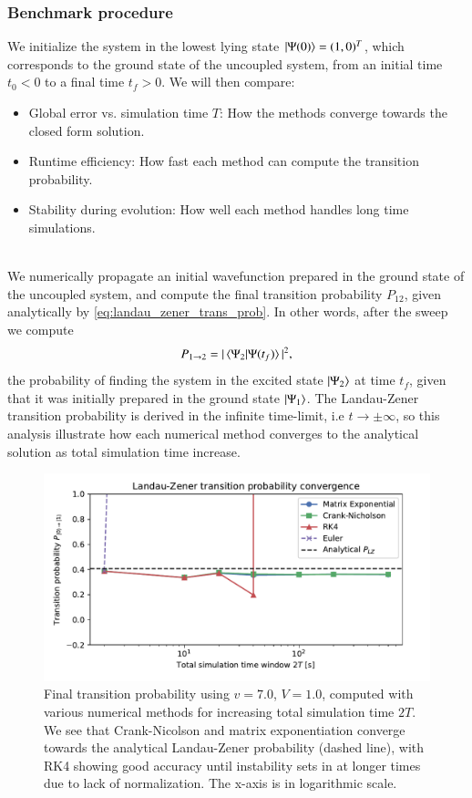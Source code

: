 \documentclass{subfiles}
\begin{document}
\subsubsection*{Benchmark procedure}
We initialize the system in the lowest lying state $\ket{\Psi(0)} = (1, 0)^T$, which corresponds to the ground state of the uncoupled system, from an initial time $t_0<0$ to a final time $t_f>0$. We will then compare:
\begin{itemize}
    \item Global error vs. simulation time $T$: How the methods converge towards the closed form solution.
    \item Runtime efficiency: How fast each method can compute the transition probability.
    \item Stability during evolution: How well each method handles long time simulations. 
\end{itemize}
\\ 
We numerically propagate an initial wavefunction prepared in the ground state of the uncoupled system, and compute the final transition probability $P_{12}$, given analytically by \eqref{eq:landau_zener_trans_prob}. In other words, after the sweep we compute 
\begin{align*}
    P_{1\to2} = |\braket{\Psi_2|\Psi(t_f)}|^2,
\end{align*}
the probability of finding the system in the excited state $\ket{\Psi_2}$ at time $t_f$, given that it was initially prepared in the ground state $\ket{\Psi_1}$. The Landau-Zener transition probability is derived in the infinite time-limit, i.e $t\rightarrow \pm \infty$, so this analysis illustrate how each numerical method converges to the analytical solution as total simulation time increase.
\begin{figure}[h!]
\centering
\includegraphics[width=1.0\textwidth]{figs/landau_zener_convergence_benchmark.pdf}
\caption{Final transition probability using $v=7.0$, $V=1.0$, computed with various numerical methods for increasing total simulation time $
2T$. We see that Crank-Nicolson and matrix exponentiation converge towards the analytical Landau-Zener probability (dashed line), with RK4 showing good accuracy until instability sets in at longer times due to lack of normalization. The x-axis is in logarithmic scale.}
\label{fig:landau_zener_convergence_benchmark}
\end{figure}
\end{document}

